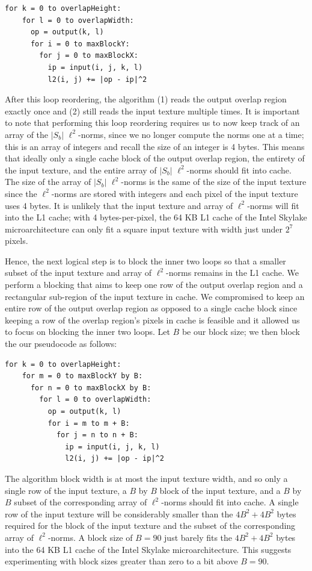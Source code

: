 \documentclass[letterpaper]{article}
\begin{document}
\begin{lstlisting}[style=cppstyle]
  for k = 0 to overlapHeight:
    for l = 0 to overlapWidth:
      op = output(k, l)
      for i = 0 to maxBlockY:
        for j = 0 to maxBlockX:
          ip = input(i, j, k, l)
          l2(i, j) += |op - ip|^2
\end{lstlisting}

After this loop reordering, the algorithm (1) reads the output overlap region exactly once and (2) still reads the input texture multiple times. It is important to note that performing this loop reordering requires us to now keep track of an array of the $|S_b|$ $\ell ^2$-norms, since we no longer compute the norms one at a time; this is an array of integers and recall the size of an integer is 4 bytes. This means that ideally only a single cache block of the output overlap region, the entirety of the input texture, and the entire array of $|S_b|$ $\ell ^2$-norms should fit into cache. The size of the array of $|S_b|$ $\ell ^2$-norms is the same of the size of the input texture since the $\ell ^2$-norms are stored with integers and each pixel of the input texture uses 4 bytes. It is unlikely that the input texture and array of $\ell ^2$-norms will fit into the L1 cache; with 4 bytes-per-pixel, the 64 KB L1 cache of the Intel Skylake microarchitecture can only fit a square input texture with width just under $2^7$ pixels.

Hence, the next logical step is to block the inner two loops so that a smaller subset of the input texture and array of $\ell ^2$-norms remains in the L1 cache. We perform a blocking that aims to keep one row of the output overlap region and a rectangular sub-region of the input texture in cache. We compromised to keep an entire row of the output overlap region as opposed to a single cache block since keeping a row of the overlap region's pixels in cache is feasible and it allowed us to focus on  blocking the inner two loops. Let $B$ be our block size; we then block the our pseudocode as follows:

\begin{lstlisting}[style=cppstyle]
  for k = 0 to overlapHeight:
    for m = 0 to maxBlockY by B:
      for n = 0 to maxBlockX by B:
        for l = 0 to overlapWidth:
          op = output(k, l)
          for i = m to m + B:
            for j = n to n + B:
              ip = input(i, j, k, l)
              l2(i, j) += |op - ip|^2
\end{lstlisting}

The algorithm block width is at most the input texture width, and so only a single row of the input texture, a $B$ by $B$ block of the input texture, and a $B$ by $B$ subset of the corresponding array of $\ell ^2$-norms should fit into cache. A single row of the input texture will be considerably smaller than the $4B^2 + 4B^2$ bytes required for the block of the input texture and the subset of the corresponding array of $\ell ^2$-norms. A block size of $B = 90$ just barely fits the $4B^2 + 4B^2$ bytes into the 64 KB L1 cache of the Intel Skylake microarchitecture. This suggests experimenting with block sizes greater than zero to a bit above $B=90$.
\end{document}
